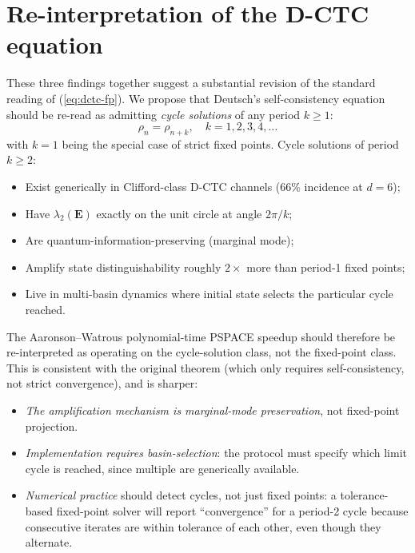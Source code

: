 \documentclass[11pt,a4paper]{article}
\begin{document}
\section{Re-interpretation of the D-CTC equation}

These three findings together suggest a substantial revision of the
standard reading of (\ref{eq:dctc-fp}). We propose that Deutsch's
self-consistency equation should be re-read as admitting
\emph{cycle solutions} of any period $k \ge 1$:
\begin{equation}
\rho_n = \rho_{n + k}, \quad k = 1, 2, 3, 4, \ldots
\end{equation}
with $k = 1$ being the special case of strict fixed points. Cycle
solutions of period $k \ge 2$:
\begin{itemize}
\item Exist generically in Clifford-class D-CTC channels (66\%
incidence at $d=6$);
\item Have $\lambda_2(\mathbf{E})$ exactly on the unit circle at
angle $2\pi/k$;
\item Are quantum-information-preserving (marginal mode);
\item Amplify state distinguishability roughly $2\times$ more than
period-1 fixed points;
\item Live in multi-basin dynamics where initial state selects the
particular cycle reached.
\end{itemize}

The Aaronson--Watrous polynomial-time PSPACE speedup
\cite{AaronsonWatrous2009} should therefore be re-interpreted as
operating on the cycle-solution class, not the fixed-point class.
This is consistent with the original theorem (which only requires
self-consistency, not strict convergence), and is sharper:

\begin{itemize}
\item \emph{The amplification mechanism is marginal-mode preservation},
not fixed-point projection.
\item \emph{Implementation requires basin-selection}: the protocol
must specify which limit cycle is reached, since multiple are
generically available.
\item \emph{Numerical practice} should detect cycles, not just
fixed points: a tolerance-based fixed-point solver will report
``convergence'' for a period-2 cycle because consecutive iterates
are within tolerance of each other, even though they alternate.
\end{itemize}
\end{document}

